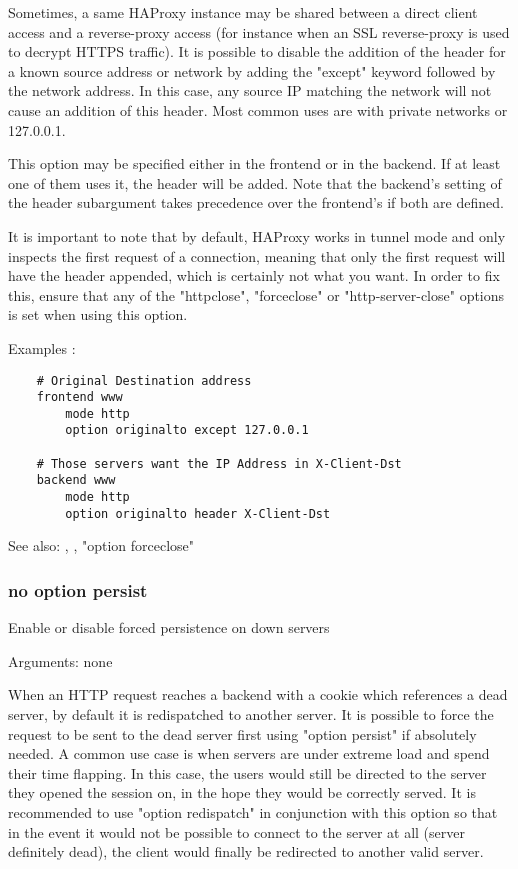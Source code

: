   Sometimes, a same HAProxy instance may be shared between a direct client
  access and a reverse-proxy access (for instance when an SSL reverse-proxy is
  used to decrypt HTTPS traffic). It is possible to disable the addition of the
  header for a known source address or network by adding the "except" keyword
  followed by the network address. In this case, any source IP matching the
  network will not cause an addition of this header. Most common uses are with
  private networks or 127.0.0.1.

  This option may be specified either in the frontend or in the backend. If at
  least one of them uses it, the header will be added. Note that the backend's
  setting of the header subargument takes precedence over the frontend's if
  both are defined.

  It is important to note that by default, HAProxy works in tunnel mode and
  only inspects the first request of a connection, meaning that only the first
  request will have the header appended, which is certainly not what you want.
  In order to fix this, ensure that any of the "httpclose", "forceclose" or
  "http-server-close" options is set when using this option.

  Examples :
\begin{verbatim}
    # Original Destination address
    frontend www
        mode http
        option originalto except 127.0.0.1

    # Those servers want the IP Address in X-Client-Dst
    backend www
        mode http
        option originalto header X-Client-Dst
\end{verbatim}


See also: , ,
             "option forceclose"

\subsubsection[persist]{}
\subsubsection*{no option persist}


  Enable or disable forced persistence on down servers


  Arguments: none

  When an HTTP request reaches a backend with a cookie which references a dead
  server, by default it is redispatched to another server. It is possible to
  force the request to be sent to the dead server first using "option persist"
  if absolutely needed. A common use case is when servers are under extreme
  load and spend their time flapping. In this case, the users would still be
  directed to the server they opened the session on, in the hope they would be
  correctly served. It is recommended to use "option redispatch" in conjunction
  with this option so that in the event it would not be possible to connect to
  the server at all (server definitely dead), the client would finally be
  redirected to another valid server.

